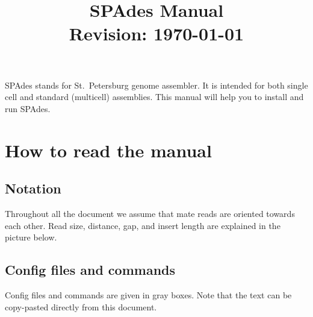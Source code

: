 \documentclass{article}
\def\spades{SPAdes}
\begin{document}
\title{{\spades} Manual\\{\small Revision: \today}}
\date{}
\maketitle

{\spades} stands for St.~Petersburg genome assembler.
It is intended for both single cell and standard (multicell) 
assemblies. 
This manual will help you to install and run
{\spades}.



\renewcommand{\contentsname}{}
\tableofcontents

\pagebreak

\listoftodos

\pagebreak

\section{How to read the manual}
\subsection{Notation}
Throughout all the document we assume that mate reads are oriented 
towards each other. Read size, distance, gap, and insert length are 
explained in the picture below.

\begin{center}
\end{center}

\subsection{Config files and commands}
Config files and commands are given in gray boxes. 
Note that the text can be copy-pasted directly from this document.
\end{document}
